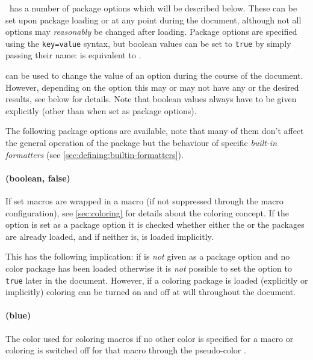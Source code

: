 \documentclass[12pt]{scrartcl}
\begin{document}
\luaformatters\ has a number of package options which will be described
below.  These can be set upon package loading or at any point during the
document, although not all options may \emph{reasonably} be changed after
loading.  Package options are specified using the \texttt{key=value} syntax, but
boolean values can be set to \texttt{true} by simply passing their name:
\luavar{[color]} is equivalent to \luavar{[color=true]}.

 can be used to change the value of
an option during the course of the document.  However, depending on the option
this may or may not have any or the desired results, see below for details.
Note that boolean values always have to be given explicitly (other than when set
as package options).

The following package options are available, note that many of them don't affect
the general operation of the package but the behaviour of specific
\emph{built-in formatters} (see \vref{sec:defining:builtin-formatters}).


\paragraph{ (boolean, false)}

If set macros are wrapped in a  macro (if not suppressed through
the macro configuration),  see \vref{sec:coloring} for details about the
coloring concept.  If the option is set as a package option it is checked
whether either the  or the  packages are already
loaded, and if neither is,  is loaded implicitly.

This has the following implication: if  is \emph{not} given as a
package option and no color package has been loaded otherwise it is \emph{not}
possible to set the option to \texttt{true} later in the document.  However, if
a coloring package is loaded (explicitly or implicitly) coloring can be turned
on and off at will throughout the document.

\paragraph{ (blue)}

The color used for coloring macros if no other color is specified for a macro or
coloring is switched off for that macro through the pseudo-color
.
\end{document}
